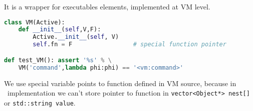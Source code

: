 \label{VMcommand}

It is a wrapper for executables elements, implemented at VM level.
\begin{lstlisting}[language=Python]
class VM(Active):
	def __init__(self,V,F):
		Active.__init__(self, V)
		self.fn = F					# special function pointer

def test_VM(): assert '%s' % \
	VM('command',lambda phi:phi) == '<vm:command>'
\end{lstlisting}

\noindent
We use special variable points to function defined in VM source, because in
\cpp\ implementation we can't store pointer to function in
\verb|vector<Object*> nest[]| or \verb|std::string value|.
